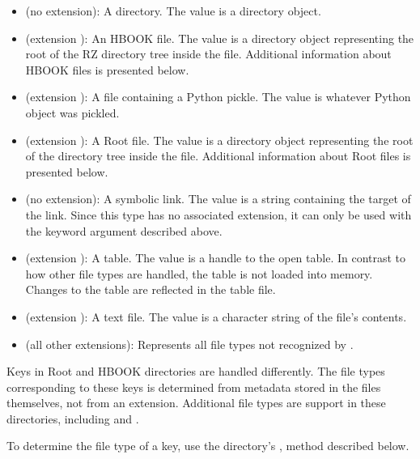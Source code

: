 \begin{itemize}
 \item {} (no extension): A directory.  The value is a
 directory object.  

 \item {} (extension ): An HBOOK file.
 The value is a directory object representing the root of the RZ
 directory tree inside the file.  Additional information about HBOOK
 files is presented below.

 \item {} (extension ): A file containing a
 Python pickle.  The value is whatever Python object was pickled.

 \item {} (extension ): A Root file.  The
 value is a directory object representing the root of the directory tree
 inside the file.  Additional information about Root files is presented
 below.

 \item {} (no extension): A symbolic link.  The value is a
 string containing the target of the link.  Since this type has no
 associated extension, it can only be used with the  keyword
 argument described above.

 \item {} (extension ): A \pyhep table.  The
 value is a handle to the open table.  In contrast to how other file
 types are handled, the table is not loaded into memory.  Changes to the
 table are reflected in the table file.

 \item {} (extension ): A text file.  The value is
 a character string of the file's contents.

 \item {} (all other extensions): Represents all file
 types not recognized by \pyhep.
\end{itemize}

Keys in Root and HBOOK directories are handled differently.  The file
types corresponding to these keys is determined from metadata stored in
the files themselves, not from an extension.  Additional file types are
support in these directories, including  and
.

To determine the file type of a key, use the directory's
, method described below.


